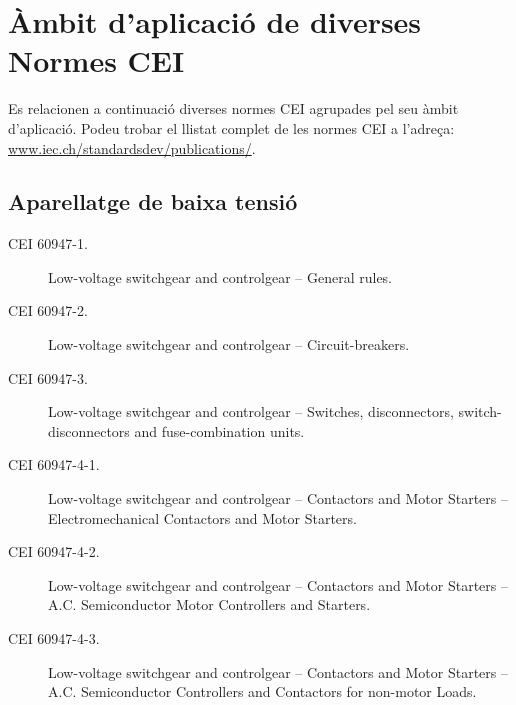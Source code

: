 \section{Àmbit d'aplicació de diverses Normes CEI}\label{sec:normes_IEC}

Es relacionen a continuació diverses normes CEI agrupades pel seu àmbit d'aplicació. Podeu trobar el llistat complet de les normes CEI a l'adreça: \href{http://www.iec.ch/standardsdev/publications/}{www.iec.ch/standardsdev/publications/}.

\subsection*{Aparellatge de baixa tensió}
\begin{description}
    \item [\hspace{5mm}CEI 60947-1.] Low-voltage switchgear and controlgear -- General rules.
    \item [\hspace{5mm}CEI 60947-2.] Low-voltage switchgear and controlgear -- Circuit-breakers.
    \item [\hspace{5mm}CEI 60947-3.] Low-voltage switchgear and controlgear -- Switches, disconnectors, switch-dis\-con\-nec\-tors and fuse-combination units.
    \item [\hspace{5mm}CEI 60947-4-1.] Low-voltage switchgear and controlgear -- Contactors and Motor Starters -- Electromechanical Contactors and Motor Starters.
    \item [\hspace{5mm}CEI 60947-4-2.] Low-voltage switchgear and controlgear -- Contactors and Motor Starters -- A.C. Semiconductor Motor Controllers and Starters.
    \item [\hspace{5mm}CEI 60947-4-3.] Low-voltage switchgear and controlgear -- Contactors and Motor Starters -- A.C. Semiconductor Controllers and Contactors for non-motor Loads.
\end{description}

